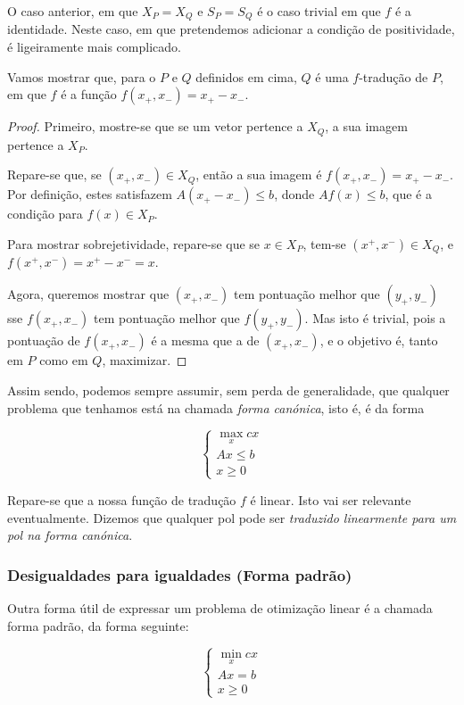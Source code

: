 \documentclass{article}
\theoremstyle{definition}
\begin{document}
	O caso anterior, em que $X_P = X_Q$ e $S_P = S_Q$ é o caso trivial em que $f$ é a identidade. Neste caso, em que pretendemos adicionar a condição de positividade, é ligeiramente mais complicado.
	
	Vamos mostrar que, para o $P$ e $Q$ definidos em cima, $Q$ é uma $f$-tradução de $P$, em que $f$ é a função $f(x_+, x_-) = x_+ - x_-$.
	
	\begin{proof}
	Primeiro, mostre-se que se um vetor pertence a $X_Q$, a sua imagem pertence a $X_P$.
	
	Repare-se que, se $(x_+, x_-) \in X_Q$, então a sua imagem é $f(x_+, x_-) = x_+ - x_-$. Por definição, estes satisfazem $A(x_+ - x_-) \leq b$, donde $A f(x) \leq b$, que é a condição para $f(x) \in X_P$.
	
	Para mostrar sobrejetividade, repare-se que se $x \in X_P$, tem-se $(x^+, x^-) \in X_Q$, e $f(x^+, x^-) = x^+ - x^- = x$.
	
	Agora, queremos mostrar que $(x_+, x_-)$ tem pontuação melhor que $(y_+, y_-)$ sse $f(x_+, x_-)$ tem pontuação melhor que $f(y_+, y_-)$. Mas isto é trivial, pois a pontuação de $f(x_+, x_-)$ é a mesma que a de $(x_+, x_-)$, e o objetivo é, tanto em $P$ como em $Q$, maximizar.
	\end{proof}
	
	Assim sendo, podemos sempre assumir, sem perda de generalidade, que qualquer problema que tenhamos está na chamada \emph{forma canónica}, isto é, é da forma
	
	\[
	\begin{cases}
	\max\limits_x cx\\
	Ax \leq b\\
	x \geq 0
	\end{cases}
	\]
	
	Repare-se que a nossa função de tradução $f$ é linear. Isto vai ser relevante eventualmente. Dizemos que qualquer pol pode ser \emph{traduzido linearmente para um pol na forma canónica}.
	
	\subsubsection{Desigualdades para igualdades (Forma padrão)}
	
	Outra forma útil de expressar um problema de otimização linear é a chamada forma padrão, da forma seguinte:
	
	\[
	\begin{cases}
	\min\limits_x cx\\
	Ax = b\\
	x \geq 0
	\end{cases}
	\]
	
\end{document}
